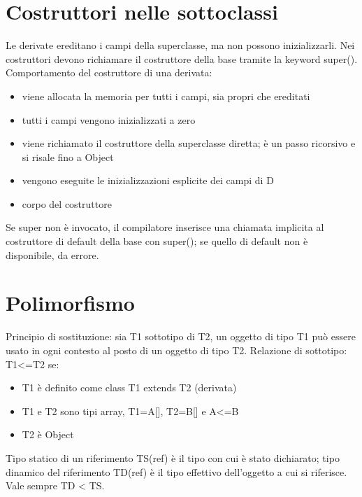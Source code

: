 \section{Costruttori nelle sottoclassi}
Le derivate ereditano i campi della superclasse, ma non possono inizializzarli. Nei costruttori devono richiamare il costruttore della base tramite la keyword super().
Comportamento del costruttore di una derivata:
\begin{itemize}
\item viene allocata la memoria per tutti i campi, sia propri che ereditati
\item tutti i campi vengono inizializzati a zero
\item viene richiamato il costruttore della superclasse diretta; è un passo ricorsivo e si risale fino a Object
\item vengono eseguite le inizializzazioni esplicite dei campi di D
\item corpo del costruttore
\end{itemize}

Se super non è invocato, il compilatore inserisce una chiamata implicita al costruttore di default della base con super(); se quello di default non è disponibile, da errore.


\section{Polimorfismo}

Principio di sostituzione: sia T1 sottotipo di T2, un oggetto di tipo T1 può essere usato in ogni contesto al posto di un oggetto di tipo T2.
Relazione di sottotipo: T1<=T2 se:
\begin{itemize}
\item T1 è definito come class T1 extends T2 (derivata)
\item T1 e T2 sono tipi array, T1=A[], T2=B[] e A<=B
\item T2 è Object
\end{itemize}

Tipo statico di un riferimento TS(ref) è il tipo con cui è stato dichiarato; tipo dinamico del riferimento TD(ref) è il tipo effettivo dell'oggetto a cui si riferisce. Vale sempre TD < TS.

